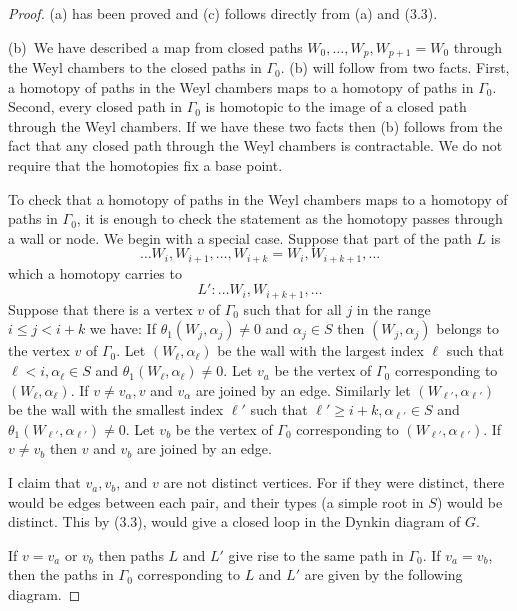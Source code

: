\documentclass{memo-l}
\theoremstyle{definition}
\theoremstyle{remark}
\numberwithin{section}{chapter}
\numberwithin{equation}{chapter}
\begin{document}
\begin{proof}  (a) has been proved and (c) follows directly from
(a) and (3.3).

   (b)\ We have described a map from closed paths $W_{0},\ldots
,W_{p},W_{p+1} = W_{0}$ through the Weyl chambers to the closed paths in
${\Gamma}_{0}$.  (b) will follow from two facts.  First, a homotopy of
paths in the Weyl chambers maps to a homotopy of paths in ${\Gamma}_{0}$.
Second, every closed path in ${\Gamma}_{0}$ is homotopic to the image of a
closed path through the Weyl chambers.  If we have these two facts then
(b) follows from the fact that any closed path through the Weyl chambers
is contractable.  We do not require that the homotopies fix a base point.

   To check that a homotopy of paths in the Weyl chambers maps to a
homotopy of paths in ${\Gamma}_{0}$, it is enough to check the statement as
the homotopy passes through a wall or node.  We begin with a special case.
Suppose that part of the path $L$ is
$$
\ldots W_{i},W_{i+1},\ldots ,W_{i+k}=W_{i},W_{i+k+1},\ldots
$$
which a homotopy carries to 
$$
L':  \ldots W_{i},W_{i+k+1},\ldots 
$$
Suppose that there is a vertex $v$ of ${\Gamma}_{0}$ such that for all $j$
in the range $i \le j < i+k$ we have: If
${\theta}_{1}(W_{j},{\alpha}_{j})\ne 0$ and ${\alpha}_{j}  \in  S$ then
$(W_{j},{\alpha}_{j})$ belongs to the vertex $v$ of ${\Gamma}_{0}$.  Let
$(W_{\ell},{\alpha}_{{\ell}})$ be the wall with the largest index
${\ell}$ such that ${\ell} < i, {\alpha}_{{\ell}}  \in  S$ and
${\theta}_{1}(W_{{\ell}},{\alpha}_{{\ell}}) \ne 0$.  Let $v_{a}$ be the
vertex of ${\Gamma}_{0}$ corresponding to $(W_{{\ell}},{\alpha}_{{\ell}})$.
If $v \ne v_{{\alpha}}, v$ and $v_{{\alpha}}$ are joined by an edge.
Similarly let $(W_{{\ell}'},{\alpha}_{{\ell}'})$ be the wall with the
smallest index ${\ell}'$ such that ${\ell}' \ge i+k, {\alpha}_{{\ell}'}
 \in  S$ and ${\theta}_{1}(W_{{\ell}'},{\alpha}_{{\ell}'}) \ne 0$.  Let
$v_{b}$ be the vertex of ${\Gamma}_{0}$ corresponding to
$(W_{{\ell}'},{\alpha}_{{\ell}'})$.  If $v \ne v_{b}$ then $v$ and $v_{b}$
are joined by an edge.


   I claim that $v_{a}, v_{b}$, and $v$ are not distinct vertices.  For if
they were distinct, there would be edges between each pair, and their types
(a simple root in $S$) would be distinct.  This by (3.3), would give a
closed loop in the Dynkin diagram of $G$.

   If $v = v_{a}$ or $v_{b}$ then paths $L$ and $L'$ give rise to the same
path in ${\Gamma}_{0}$.  If $v_{a} = v_{b}$, then the paths in
${\Gamma}_{0}$ corresponding to $L$ and $L'$ are given by the following
diagram.
		     

\end{proof}
\end{document}
